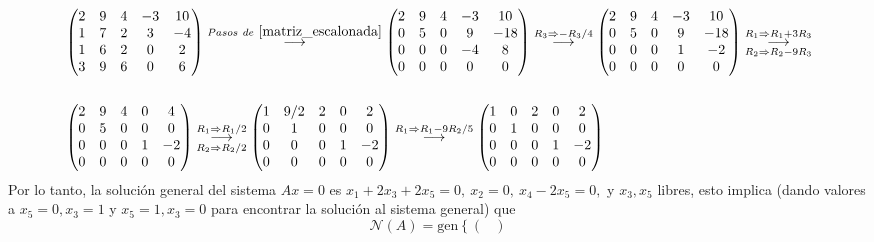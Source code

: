 \documentclass[11pt,letterpaper]{article}
\newcommand{\mcN}{\mathcal{N}}
\newcommand{\grstep}[2][\relax]{%
   \ensuremath{\mathrel{
       {\mathop{\longrightarrow}\limits^{#2\mathstrut}_{
                                     \begin{subarray}{l} #1 \end{subarray}}}}}}
\newcommand{\gen}{\text{gen}}
\begin{document}
\begin{enumerate}
\begin{align*}
&\begin{pmatrix}
2 & 9 & 4 & -3 & 10\\
1 & 7 & 2 &  3 & -4\\
1 & 6 & 2 &  0 &  2\\
3 & 9 & 6 &  0 & 6
\end{pmatrix}%
\grstep[]{Pasos\ de \ \ref{matriz_escalonada}}
%
\begin{pmatrix}
2 & 9 & 4 & -3 & 10\\
0 & 5 & 0 &  9 & -18\\
0 & 0 & 0 & -4 &  8\\
0 & 0 & 0 &  0 & 0
\end{pmatrix}%
\grstep[]{R_3 \Rightarrow -R_3/4}
%
\begin{pmatrix}
2 & 9 & 4 & -3 & 10\\
0 & 5 & 0 &  9 & -18\\
0 & 0 & 0 &  1 & -2\\
0 & 0 & 0 &  0 & 0
\end{pmatrix}%
\grstep[R_2\Rightarrow R_2-9R_3]{R_1 \Rightarrow R_1+3R_3}\\ \\
&\begin{pmatrix}
2 & 9 & 4 &  0 & 4\\
0 & 5 & 0 &  0 & 0\\
0 & 0 & 0 &  1 &-2\\
0 & 0 & 0 &  0 & 0
\end{pmatrix}%
\grstep[R_2\Rightarrow R_2/2]{R_1 \Rightarrow R_1/2}
%
\begin{pmatrix}
1 & 9/2 & 2 &  0 & 2\\
0 & 1 & 0 &  0 & 0\\
0 & 0 & 0 &  1 &-2\\
0 & 0 & 0 &  0 & 0
\end{pmatrix}%
\grstep[]{R_1 \Rightarrow R_1-9R_2/5}
%
\begin{pmatrix}
1 & 0 & 2 &  0 & 2\\
0 & 1 & 0 &  0 & 0\\
0 & 0 & 0 &  1 &-2\\
0 & 0 & 0 &  0 & 0
\end{pmatrix}
\end{align*}
Por lo tanto, la solución general del sistema $Ax=0$ es $x_1+2x_3+2x_5=0, \ x_2=0, \ x_4-2x_5=0,$ y $x_3, x_5$ libres, esto implica (dando valores a $x_5=0,x_3=1$ y $x_5=1,x_3=0$ para encontrar la solución al sistema general) que 
$$\mcN(A)=\gen\left\{\begin{pmatrix}

\end{pmatrix}$$
\end{enumerate}
\end{document}
